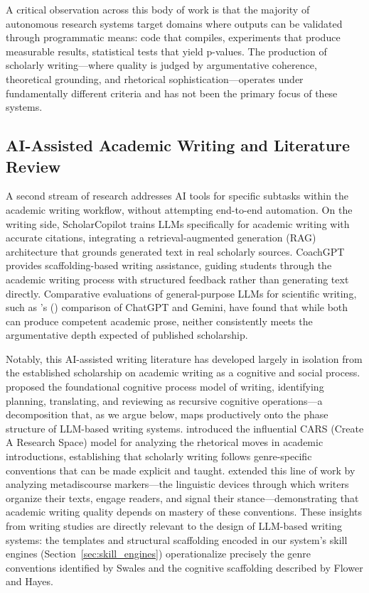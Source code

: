 \documentclass{article}
\begin{document}
A critical observation across this body of work is that the majority of autonomous research systems target domains where outputs can be validated through programmatic means: code that compiles, experiments that produce measurable results, statistical tests that yield p-values. The production of scholarly writing---where quality is judged by argumentative coherence, theoretical grounding, and rhetorical sophistication---operates under fundamentally different criteria and has not been the primary focus of these systems.

\subsection{AI-Assisted Academic Writing and Literature Review}

A second stream of research addresses AI tools for specific subtasks within the academic writing workflow, without attempting end-to-end automation. On the writing side, ScholarCopilot \citep{wang2025scholarcopilot} trains LLMs specifically for academic writing with accurate citations, integrating a retrieval-augmented generation (RAG) architecture that grounds generated text in real scholarly sources. CoachGPT \citep{chen2025coachgpt} provides scaffolding-based writing assistance, guiding students through the academic writing process with structured feedback rather than generating text directly. Comparative evaluations of general-purpose LLMs for scientific writing, such as \citeauthor{alsagri2024chatgpt_gemini}'s (\citeyear{alsagri2024chatgpt_gemini}) comparison of ChatGPT and Gemini, have found that while both can produce competent academic prose, neither consistently meets the argumentative depth expected of published scholarship.

Notably, this AI-assisted writing literature has developed largely in isolation from the established scholarship on academic writing as a cognitive and social process. \citet{flower1981cognitive} proposed the foundational cognitive process model of writing, identifying planning, translating, and reviewing as recursive cognitive operations---a decomposition that, as we argue below, maps productively onto the phase structure of LLM-based writing systems. \citet{swales1990genre} introduced the influential CARS (Create A Research Space) model for analyzing the rhetorical moves in academic introductions, establishing that scholarly writing follows genre-specific conventions that can be made explicit and taught. \citet{hyland2005metadiscourse} extended this line of work by analyzing metadiscourse markers---the linguistic devices through which writers organize their texts, engage readers, and signal their stance---demonstrating that academic writing quality depends on mastery of these conventions. These insights from writing studies are directly relevant to the design of LLM-based writing systems: the templates and structural scaffolding encoded in our system's skill engines (Section~\ref{sec:skill_engines}) operationalize precisely the genre conventions identified by Swales and the cognitive scaffolding described by Flower and Hayes.
\end{document}
